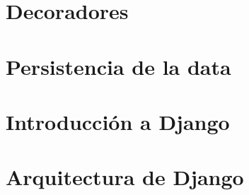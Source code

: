 \documentclass[12pt,a4paper,oneside, openany]{book}
\begin{document}
 \chapter{Decoradores}
    

 \chapter{Persistencia de la data}
    
    
 \chapter{Introducción a Django}
    

 \chapter{Arquitectura de Django}
    

   
   
\end{document}
